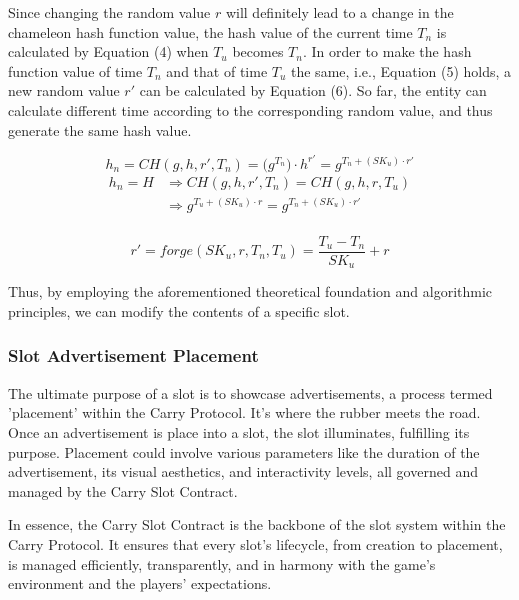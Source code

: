 Since changing the random value $r$ will definitely lead to a change in the chameleon hash function value, the hash value of the current time $T_n$ is calculated by Equation (4) when $T_u$ becomes $T_n$. In order to make the hash function value of time $T_n$ and that of time $T_u$ the same, i.e., Equation (5) holds, a new random value $r'$ can be calculated by Equation (6). So far, the entity can calculate different time according to the corresponding random value, and thus generate the same hash value.

\begin{equation}
    h_n=CH(g,h,r',T_n)=\big(g^{T_n}\big)\cdot h^{r'}=g^{T_n+(SK_u)\cdot r'}
\end{equation}
\begin{equation}
\begin{aligned}
      h_n=H& \Rightarrow CH(g,h,r',T_n)=CH(g,h,r,T_u) \\
      & \Rightarrow g^{T_u+(SK_u)\cdot r}=g^{T_n+(SK_u)\cdot r'} \\
\end{aligned}
\end{equation}

\begin{equation}
    r'=forge(SK_u,r,T_n,T_u)=\frac{T_u-T_n}{SK_u}+r
\end{equation}

Thus, by employing the aforementioned theoretical foundation and algorithmic principles, we can modify the contents of a specific slot.

\subsubsection{Slot Advertisement Placement}

The ultimate purpose of a slot is to showcase advertisements, a process termed 'placement' within the Carry Protocol. It's where the rubber meets the road. Once an advertisement is place into a slot, the slot illuminates, fulfilling its purpose. Placement could involve various parameters like the duration of the advertisement, its visual aesthetics, and interactivity levels, all governed and managed by the Carry Slot Contract.

In essence, the Carry Slot Contract is the backbone of the slot system within the Carry Protocol. It ensures that every slot's lifecycle, from creation to placement, is managed efficiently, transparently, and in harmony with the game's environment and the players' expectations.




